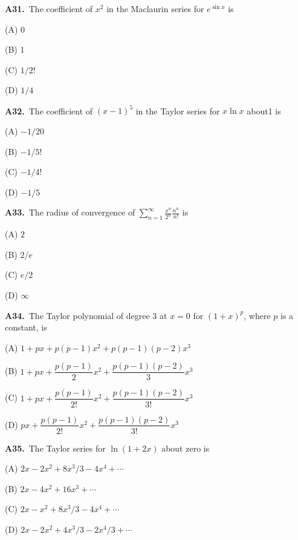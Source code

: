 \documentclass[11pt]{article}
\begin{document}
\bigskip\noindent\textbf{A31.}\ The coefficient of $x^2$ in the Maclaurin series for $e^{\sin x}$ is
\begin{list}{}{\setlength{\leftmargin}{3em}\setlength{\labelwidth}{2.5em}\setlength{\itemsep}{0pt}\setlength{\topsep}{2pt}}
\item[(A)] $0$
\item[(B)] $1$
\item[(C)] $1/2!$
\item[(D)] $1/4$
\end{list}

\bigskip\noindent\textbf{A32.}\ The coefficient of $(x-1)^5$ in the Taylor series for $x\ln x$ about1 is
\begin{list}{}{\setlength{\leftmargin}{3em}\setlength{\labelwidth}{2.5em}\setlength{\itemsep}{0pt}\setlength{\topsep}{2pt}}
\item[(A)] $-1/20$
\item[(B)] $-1/5!$
\item[(C)] $-1/4!$
\item[(D)] $-1/5$
\end{list}

\bigskip\noindent\textbf{A33.}\ The radius of convergence of $\sum_{n=1}^\infty\frac{x^n}{2^n}\frac{n^n}{n!}$ is
\begin{list}{}{\setlength{\leftmargin}{3em}\setlength{\labelwidth}{2.5em}\setlength{\itemsep}{0pt}\setlength{\topsep}{2pt}}
\item[(A)] $2$
\item[(B)] $2/e$
\item[(C)] $e/2$
\item[(D)] $\infty$
\end{list}

\bigskip\noindent\textbf{A34.}\ The Taylor polynomial of degree 3 at $x=0$ for $(1+x)^p$, where $p$ is a constant, is
\begin{list}{}{\setlength{\leftmargin}{3em}\setlength{\labelwidth}{2.5em}\setlength{\itemsep}{0pt}\setlength{\topsep}{2pt}}
\item[(A)] $1+px+p(p-1)x^2+p(p-1)(p-2)x^3$
\item[(B)] $1+px+\dfrac{p(p-1)}{2}x^2+\dfrac{p(p-1)(p-2)}{3}x^3$
\item[(C)] $1+px+\dfrac{p(p-1)}{2!}x^2+\dfrac{p(p-1)(p-2)}{3!}x^3$
\item[(D)] $px+\dfrac{p(p-1)}{2!}x^2+\dfrac{p(p-1)(p-2)}{3!}x^3$
\end{list}

\bigskip\noindent\textbf{A35.}\ The Taylor series for $\ln(1+2x)$ about zero is
\begin{list}{}{\setlength{\leftmargin}{3em}\setlength{\labelwidth}{2.5em}\setlength{\itemsep}{0pt}\setlength{\topsep}{2pt}}
\item[(A)] $2x-2x^2+8x^3/3-4x^4+\cdots$
\item[(B)] $2x-4x^2+16x^3+\cdots$
\item[(C)] $2x-x^2+8x^3/3-4x^4+\cdots$
\item[(D)] $2x-2x^2+4x^3/3-2x^4/3+\cdots$
\end{list}
\end{document}
